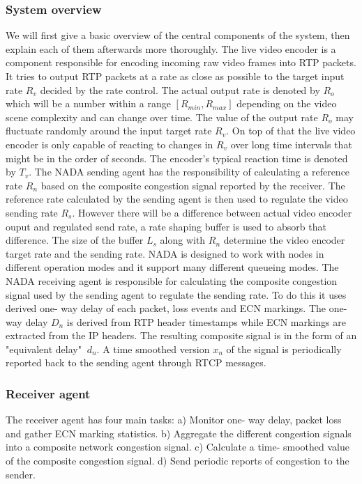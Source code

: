 \subsubsection{System overview}
We will first give a basic overview of the central components of the system, then explain each of them afterwards more thoroughly.
The live video encoder is a component responsible for encoding incoming raw video frames into RTP packets.
It tries to output RTP packets at a rate as close as possible to the target input rate $R_v$ decided by the rate control. 
The actual output rate is denoted by $R_o$ which will be a number within a range $[R_{min},R_{max}]$ depending on the video scene complexity and can change over time.
The value of the output rate $R_o$ may fluctuate randomly around the input target rate $R_v$.
On top of that the live video encoder is only capable of reacting to changes in $R_v$ over long time intervals that might be in the order of seconds.
The encoder's typical reaction time is denoted by $T_v$.
The NADA sending agent has the responsibility of calculating a reference rate $R_n$ based on the composite congestion signal reported by the receiver. 
The reference rate calculated by the sending agent is then used to regulate the video sending rate $R_s$.
However there will be a difference between actual video encoder ouput and regulated send rate, a rate shaping buffer is used to absorb that difference.
The size of the buffer $L_s$ along with $R_n$ determine the video encoder target rate and the sending rate. 
NADA is designed to work with nodes in different operation modes and it support many different queueing modes.
The NADA receiving agent is responsible for calculating the composite congestion signal used by the sending agent to regulate the sending rate. 
To do this it uses derived one- way delay of each packet, loss events and ECN markings.
The one- way delay $D_n$ is derived from RTP header timestamps while ECN markings are extracted from the IP headers. 
The resulting composite signal is in the form of an "equivalent delay" $~d_n$.
A time smoothed version $x_n$ of the signal is periodically reported back to the sending agent through RTCP messages.

\subsubsection{Receiver agent}
The receiver agent has four main tasks: 
a) Monitor one- way delay, packet loss and gather ECN marking statistics. 
b) Aggregate the different congestion signals into a composite network congestion signal. 
c) Calculate a time- smoothed value of the composite congestion signal. 
d) Send periodic reports of congestion to the sender.

